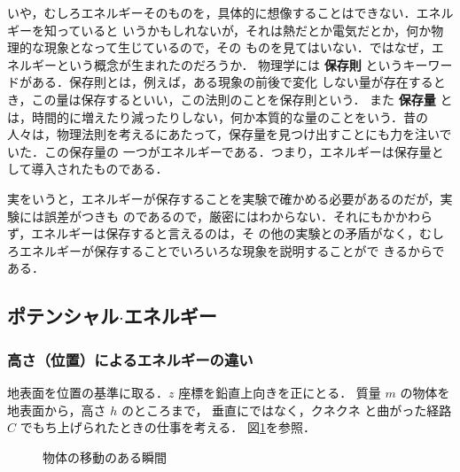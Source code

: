                 いや，むしろエネルギーそのものを，具体的に想像することはできない．エネルギーを知っていると
                いうかもしれないが，それは熱だとか電気だとか，何か物理的な現象となって生じているので，その
                ものを見てはいない．ではなぜ，エネルギーという概念が生まれたのだろうか．
                物理学には \textbf{保存則} というキーワードがある．保存則とは，例えば，ある現象の前後で変化
                しない量が存在するとき，この量は保存するといい，この法則のことを保存則という．
                また \textbf{保存量} とは，時間的に増えたり減ったりしない，何か本質的な量のことをいう．昔の
                人々は，物理法則を考えるにあたって，保存量を見つけ出すことにも力を注いでいた．この保存量の
                一つがエネルギーである．つまり，エネルギーは保存量として導入されたものである．

                実をいうと，エネルギーが保存することを実験で確かめる必要があるのだが，実験には誤差がつきも
                のであるので，厳密にはわからない．それにもかかわらず，エネルギーは保存すると言えるのは，そ
                の他の実験との矛盾がなく，むしろエネルギーが保存することでいろいろな現象を説明することがで
                きるからである．


            \subsection{ポテンシャル$\cdot$エネルギー}
            \subsubsection{高さ（位置）によるエネルギーの違い}
                地表面を位置の基準に取る．$z$ 座標を鉛直上向きを正にとる．
                質量 $m$ の物体を地表面から，高さ $h$ のところまで，
                垂直にではなく，クネクネ と曲がった経路 $C$ でもち上げられたときの仕事を考える．
                図\ref{fig:PE_fig}を参照．
                    \begin{figure}[hbt]
                        \begin{center}
                            \caption{物体の移動のある瞬間}
                            \label{fig:PE_fig}
                        \end{center}
                    \end{figure}


